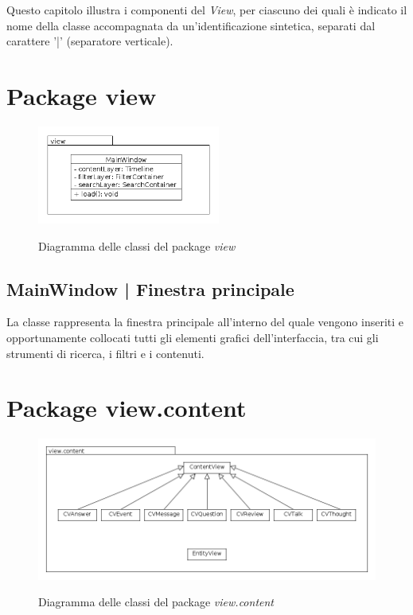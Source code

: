 \documentclass[10pt,a4paper,headinclude,footinclude,hidelinks]{scrreprt} %
\begin{document}
	Questo capitolo illustra i componenti del \textit{View}, per ciascuno dei quali è indicato il nome della classe accompagnata da un'identificazione sintetica, separati dal carattere '|' (separatore verticale).

	\section{Package view}
	\label{sec:stage:design:view}

	\begin{figure}[ht]
		\begin{center}
	    	\includegraphics[width=6cm]{class/view.png}
			\label{gfx:class:view}
			\caption{Diagramma delle classi del package \textit{view}}
		\end{center}
	\end{figure}
	
	\subsection[MainWindow]{MainWindow | Finestra principale}
	\label{sec:stage:design:view:window}
	La classe \textit{} rappresenta la finestra principale all'interno del quale vengono inseriti e opportunamente collocati tutti gli elementi grafici dell'interfaccia, tra cui gli strumenti di ricerca, i filtri e i contenuti.

	\section{Package view.content}
	\label{sec:stage:design:view.content}

	\begin{figure}[ht]
		\begin{center}
	    	\includegraphics[width=12cm]{class/view_content.png}
			\label{gfx:class:view:content}
			\caption{Diagramma delle classi del package \textit{view.content}}
		\end{center}
	\end{figure}
\end{document}
